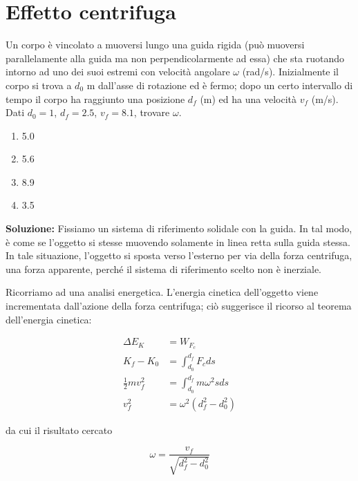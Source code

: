 
\section{Effetto centrifuga}

Un corpo è vincolato a muoversi lungo una guida
rigida (può muoversi parallelamente alla guida
ma non perpendicolarmente ad essa) che sta
ruotando intorno ad uno dei suoi estremi con
velocità angolare $\omega$ (rad/s). Inizialmente
il corpo si trova a $d_0$ m dall'asse di rotazione
ed è fermo; dopo un certo intervallo di tempo
il corpo ha raggiunto una posizione $d_f$ (m)
ed ha una velocità $v_f$ (m/s). Dati
$d_0 = 1$, $d_f = 2.5$, $v_f = 8.1$, trovare
$\omega$.
\begin{enumerate}
    \item 5.0
    \item 5.6
    \item 8.9
    \item 3.5
\end{enumerate}

\noindent \textbf{Soluzione:} Fissiamo un sistema di riferimento
solidale con la guida. In tal modo, è come se
l'oggetto si stesse muovendo solamente in linea
retta sulla guida stessa. In tale situazione,
l'oggetto si sposta verso l'esterno per via
della forza centrifuga, una forza apparente,
perché il sistema di riferimento scelto
non è inerziale.

Ricorriamo ad una analisi energetica. L'energia
cinetica dell'oggetto viene incrementata dall'azione
della forza centrifuga; ciò suggerisce il ricorso
al teorema dell'energia cinetica:

\begin{align}
    \Delta E_K &= W_{F_c}\label{g1}\\
    K_f - K_0 &= \int_{d_0}^{d_f}F_c ds\label{g2}\\
    \frac12 m v_f^2 &= \int_{d_0}^{d_f}m\omega^2sds\label{g3}\\
    v_f^2 &= \omega^2(d_f^2 - d_0^2)\label{g4}
\end{align}

\noindent da cui il risultato cercato

\[ \omega = \frac{v_f}{\sqrt{d_f^2 - d_0^2}} \]

